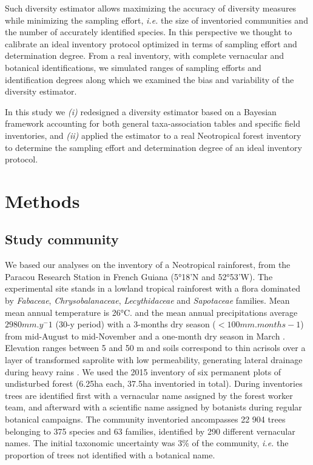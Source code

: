 \documentclass[fleqn,10pt]{ArtEcoFoG} %
\begin{document}
Such diversity estimator allows maximizing the accuracy of diversity
measures while minimizing the sampling effort, \emph{i.e.} the size of
inventoried communities and the number of accurately identified species.
In this perspective we thought to calibrate an ideal inventory protocol
optimized in terms of sampling effort and determination degree. From a
real inventory, with complete vernacular and botanical identifications,
we simulated ranges of sampling efforts and identification degrees along
which we examined the bias and variability of the diversity estimator.

In this study we \emph{(i)} redesigned a diversity estimator based on a
Bayesian framework accounting for both general taxa-association tables
and specific field inventories, and \emph{(ii)} applied the estimator to
a real Neotropical forest inventory to determine the sampling effort and
determination degree of an ideal inventory protocol.

\section{Methods}\label{methods}

\subsection{Study community}\label{study-community}

We based our analyses on the inventory of a Neotropical rainforest, from
the Paracou Research Station in French Guiana (5°18'N and 52°53'W). The
experimental site stands in a lowland tropical rainforest with a flora
dominated by \emph{Fabaceae}, \emph{Chrysobalanaceae},
\emph{Lecythidaceae} and \emph{Sapotaceae} families. Mean mean annual
temperature is 26°C. and the mean annual precipitations average
\(2980 mm.y^-1\) (30-y period) with a 3-months dry season
(\(< 100 mm.months-1\)) from mid-August to mid-November and a one-month
dry season in March \citep{Wagner2011}. Elevation ranges between 5 and
50 m and soils correspond to thin acrisols over a layer of transformed
saprolite with low permeability, generating lateral drainage during
heavy rains \citep{IUSSWorkingGroupWRB2015}. We used the 2015 inventory
of six permanent plots of undisturbed forest (6.25ha each, 37.5ha
inventoried in total). During inventories trees are identified first
with a vernacular name assigned by the forest worker team, and afterward
with a scientific name assigned by botanists during regular botanical
campaigns. The community inventoried ancompasses 22 904 trees belonging
to 375 species and 63 families, identified by 290 different vernacular
names. The initial taxonomic uncertainty was 3\% of the community,
\emph{i.e.} the proportion of trees not identified with a botanical
name.
\end{document}
